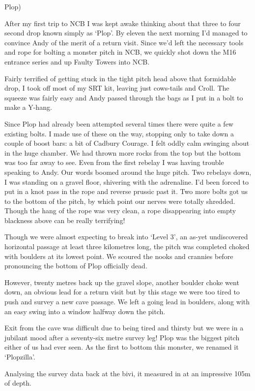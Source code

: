 Plop)

After my first trip to NCB I was kept awake thinking about that three to
four second drop known simply as `Plop'. By eleven the next morning I'd
managed to convince Andy of the merit of a return visit. Since we'd left
the necessary tools and rope for bolting a monster pitch in NCB, we
quickly shot down the M16 entrance series and up Faulty Towers into NCB.

Fairly terrified of getting stuck in the tight pitch head above that
formidable drop, I took off most of my SRT kit, leaving just cows-tails
and Croll. The squeeze was fairly easy and Andy passed through the bags
as I put in a bolt to make a Y-hang.

Since Plop had already been attempted several times there were quite a
few existing bolts. I made use of these on the way, stopping only to
take down a couple of boost bars: a bit of Cadbury Courage. I felt oddly
calm swinging about in the huge chamber. We had thrown more rocks from
the top but the bottom was too far away to see. Even from the first
rebelay I was having trouble speaking to Andy. Our words boomed around
the huge pitch. Two rebelays down, I was standing on a gravel floor,
shivering with the adrenaline. I'd been forced to put in a knot pass in
the rope and reverse prussic past it. Two more bolts got us to the
bottom of the pitch, by which point our nerves were totally shredded.
Though the hang of the rope was very clean, a rope disappearing into
empty blackness above can be really terrifying!

Though we were almost expecting to break into `Level 3', an as-yet
undiscovered horizontal passage at least three kilometres long, the
pitch was completed choked with boulders at its lowest point. We scoured
the nooks and crannies before pronouncing the bottom of Plop officially
dead.

However, twenty metres back up the gravel slope, another boulder choke
went down, an obvious lead for a return visit but by this stage we were
too tired to push and survey a new cave passage. We left a going lead in
boulders, along with an easy swing into a window halfway down the pitch.

Exit from the cave was difficult due to being tired and thirsty but we
were in a jubilant mood after a seventy-six metre survey leg! Plop was
the biggest pitch either of us had ever seen. As the first to bottom
this monster, we renamed it `Plopzilla'.

Analysing the survey data back at the bivi, it measured in at an
impressive 105m of depth.

